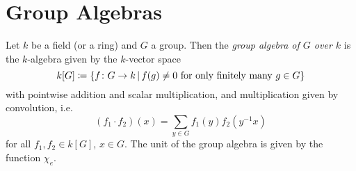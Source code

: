 \section{Group Algebras}


\begin{definition}
  Let $k$ be a field (or a ring) and $G$ a group.
  Then the \emph{group algebra of $G$ over $k$} is the $k$-algebra given by the $k$-vector space
  \[
              k[G]
    \defined  \{
                f \colon G \to k
              \suchthat
                \text{$f(g) \neq 0$ for only finitely many $g \in G$}
              \}
  \]
  with pointwise addition and scalar multiplication, and multiplication given by convolution, i.e.\
  \begin{equation}
  \label{equation: multiplication by convolution}
      (f_1 \cdot f_2)(x)
    = \sum_{y \in G} f_1(y) f_2\left( y^{-1}x \right)
  \end{equation}
  for all $f_1, f_2 \in k[G]$, $x \in G$.
  The unit of the group algebra is given by the function $\chi_e$.
\end{definition}


